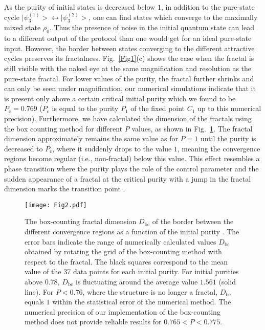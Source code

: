 \documentclass[%
 aip,
 amsmath,amssymb,
 reprint,%
]{revtex4-1}
\begin{document}
As the purity of initial states is decreased below $1$, in addition to the pure-state cycle $\big|\psi_{3}^{(1)}\big>\leftrightarrow\big|\psi_{3}^{(2)}\big>$, one can find states which converge to the maximally mixed state $\rho_{0}$. 
Thus the presence of noise in the initial quantum state can lead to a different output of the protocol than one would get for an ideal pure-state input. However, the border between states converging to the different attractive cycles preserves its fractalness. Fig.~\ref{Fig1}(c)  shows the case when the fractal is still visible with the naked eye at the same magnification and resolution as the pure-state fractal. For lower values of the purity, the fractal further shrinks and can only be seen under magnification, our numerical simulations indicate that it is present only above a certain critical initial purity which we found to be $P_{\mathrm{c}}= 0.769$ ($P_{\mathrm{c}}$ is equal to the purity $P_{1}$ of the fixed point $C_{1}$ up to this numerical precision). Furthermore, we have calculated the dimension of the fractals using the box counting method \cite{BCM} for different $P$ values, as shown in Fig.~\ref{dimension}. The fractal dimension approximately remains the same value as for $P=1$ until the purity is decreased to $P_{\mathrm{c}}$, where it suddenly drops to the value $1$, meaning the convergence regions become regular (i.e., non-fractal) below this value. This effect resembles a phase transition where the purity plays the role of the control parameter and the sudden appearance of a fractal at the critical purity with a jump in the fractal dimension marks the transition point \cite{Sole1996}.





\begin{figure}
\texttt{[image: Fig2.pdf]}
\caption{
The box-counting fractal dimension $D_{\mathrm{bc}}$ of the border between the different convergence regions as a function of the initial purity  \cite{BCM}. The error bars indicate the range of numerically calculated values $D_{\mathrm{bc}}$ obtained by rotating the grid of the box-counting method with respect to the fractal. The black squares correspond to the mean value of the 37 data points for each initial purity. For initial purities above $0.78$,  $D_{\mathrm{bc}}$ is fluctuating around the average value $1.561$ (solid line). For $P<0.76$, where the structure is no longer a fractal, $D_{\mathrm{bc}}$ equals $1$ within the statistical error of the numerical method.  The numerical precision of our implementation of the box-counting method does not provide reliable results for $0.765<P<0.775$.} 
\label{dimension}
\end{figure} 
\end{document}
